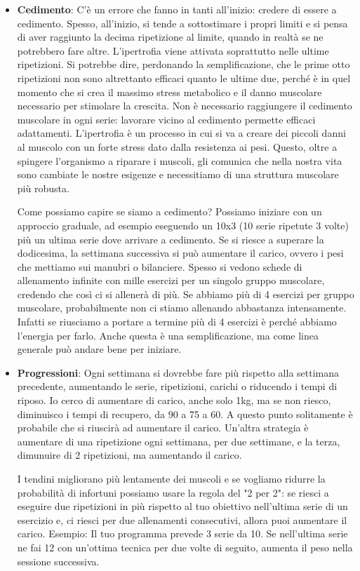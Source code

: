 \documentclass[12pt]{book} %
\begin{document}
\begin{itemize}
\item \textbf{Cedimento}:
C'è un errore che fanno in tanti all'inizio: credere di essere a cedimento.
Spesso, all'inizio, si tende a sottostimare i propri limiti e si pensa di aver raggiunto la decima ripetizione al limite, quando in realtà se ne potrebbero fare altre.
L'ipertrofia viene attivata soprattutto nelle ultime ripetizioni. Si potrebbe dire, perdonando la semplificazione, che le prime otto ripetizioni non sono altrettanto efficaci quanto le ultime due, perché è in quel momento che si crea il massimo stress metabolico e il danno muscolare necessario per stimolare la crescita. Non è necessario raggiungere il cedimento muscolare in ogni serie: lavorare vicino al cedimento permette efficaci adattamenti.
L'ipertrofia è un processo in cui si va a creare dei piccoli danni al muscolo con un forte stress dato dalla resistenza ai pesi. Questo, oltre a spingere l'organismo a riparare i muscoli, gli comunica che nella nostra vita sono cambiate le nostre esigenze e necessitiamo di una struttura muscolare più robusta.

Come possiamo capire se siamo a cedimento?
Possiamo iniziare con un approccio graduale, ad esempio eseguendo un 10x3 (10 serie ripetute 3 volte) più un ultima serie dove arrivare a cedimento. Se si riesce a superare la dodicesima, la settimana successiva si può aumentare il carico, ovvero i pesi che mettiamo sui manubri o bilanciere.
Spesso si vedono schede di allenamento infinite con mille esercizi per un singolo gruppo muscolare, credendo che così ci si allenerà di più. Se abbiamo più di 4 esercizi per gruppo muscolare, probabilmente non ci stiamo allenando abbastanza intensamente. Infatti se riusciamo a portare a termine più di 4 esercizi è perché abbiamo l'energia per farlo. Anche questa è una semplificazione, ma come linea generale può andare bene per iniziare.

\item \textbf{Progressioni}:
Ogni settimana si dovrebbe fare più rispetto alla settimana precedente, aumentando le serie, ripetizioni, carichi o riducendo i tempi di riposo.
Io cerco di aumentare di carico, anche solo 1kg, ma se non riesco, diminuisco i tempi di recupero, da 90 a 75 a 60. A questo punto solitamente è probabile che si riuscirà ad aumentare il carico.
Un'altra strategia è aumentare di una ripetizione ogni settimana, per due settimane, e la terza, dimunuire di 2 ripetizioni, ma aumentando il carico.

I tendini migliorano più lentamente dei muscoli e se vogliamo ridurre la probabilità di infortuni possiamo usare la regola del "2 per 2": se riesci a eseguire due ripetizioni in più rispetto al tuo obiettivo nell'ultima serie di un esercizio e, ci riesci per due allenamenti consecutivi, allora puoi aumentare il carico. Esempio: Il tuo programma prevede 3 serie da 10. Se nell'ultima serie ne fai 12 con un'ottima tecnica per due volte di seguito, aumenta il peso nella sessione successiva.


\end{itemize}
\end{document}
